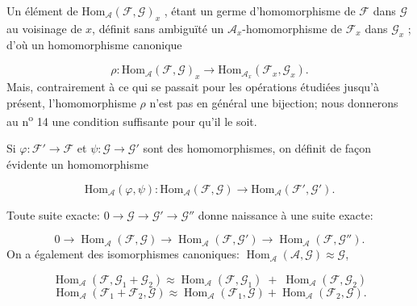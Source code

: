 Un élément de $\mathrm{Hom}_{\mathcal{A}}(\mathcal{F}, \mathcal{G})_x$ , étant un germe d'homomorphisme de $\mathcal{F}$ dans $\mathcal{G}$ au voisinage de $x$, définit sans ambiguïté un $\mathcal{A}_x$-homomorphisme de $\mathcal{F}_x$ dans $\mathcal{G}_x$ ; d'où un homomorphisme canonique

\begin{equation*}
\rho : \mathrm{Hom}_{\mathcal{A}}(\mathcal{F}, \mathcal{G})_x \to \mathrm{Hom}_{\mathcal{A}_x}(\mathcal{F}_x , \mathcal{G}_x).
\end{equation*}
Mais, contrairement à ce qui se passait pour les opérations étudiées jusqu'à présent, l'homomorphisme $\rho$ n'est pas en général une bijection; nous donnerons au n\textsuperscript{o} 14 une condition suffisante pour qu'il le soit.

Si $\varphi : \mathcal{F}' \to \mathcal{F}$ et $\psi : \mathcal{G} \to \mathcal{G}'$ sont des homomorphismes, on définit de façon évidente un homomorphisme

\begin{equation*}
\mathrm{Hom}_{\mathcal{A}}(\varphi, \psi) : \mathrm{Hom}_{\mathcal{A}}(\mathcal{F}, \mathcal{G}) \to \mathrm{Hom}_{\mathcal{A}}(\mathcal{F}', \mathcal{G}').
\end{equation*}


Toute suite exacte: $0 \to \mathcal{G} \to \mathcal{G}' \to \mathcal{G}''$ donne naissance à une suite exacte:

\begin{equation*}
0 \to \operatorname{Hom}_{\mathcal{A}}(\mathcal{F}, \mathcal{G}) \to \operatorname{Hom}_{\mathcal{A}}(\mathcal{F}, \mathcal{G}') \to \operatorname{Hom}_{\mathcal{A}}(\mathcal{F}, \mathcal{G}'').
\end{equation*}
On a également des isomorphismes canoniques: $\operatorname{Hom}_{\mathcal{A}}(\mathcal{A}, \mathcal{G}) \approx \mathcal{G}$,

\begin{equation*}
\operatorname{Hom}_{\mathcal{A}}(\mathcal{F}, \mathcal{G}_1 + \mathcal{G}_2) \approx \operatorname{Hom}_{\mathcal{A}}(\mathcal{F}, \mathcal{G}_1) \; + \; \operatorname{Hom}_{\mathcal{A}}(\mathcal{F}, \mathcal{G}_2)
\end{equation*}
\begin{equation*}
\operatorname{Hom}_{\mathcal{A}}(\mathcal{F}_1 + \mathcal{F}_2 , \mathcal{G}) \approx \operatorname{Hom}_{\mathcal{A}}(\mathcal{F}_1 , \mathcal{G}) + \operatorname{Hom}_{\mathcal{A}}(\mathcal{F}_2 , \mathcal{G}).
\end{equation*}

